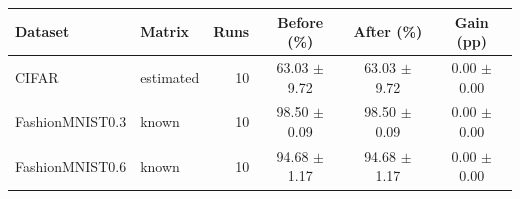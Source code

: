 \begin{tabular}{llrccc}
Dataset & Matrix & Runs & Before (\%) & After (\%) & Gain (pp) \\
\hline
CIFAR & estimated & 10 & 63.03 $\pm$ 9.72 & 63.03 $\pm$ 9.72 & 0.00 $\pm$ 0.00\\
FashionMNIST0.3 & known & 10 & 98.50 $\pm$ 0.09 & 98.50 $\pm$ 0.09 & 0.00 $\pm$ 0.00\\
FashionMNIST0.6 & known & 10 & 94.68 $\pm$ 1.17 & 94.68 $\pm$ 1.17 & 0.00 $\pm$ 0.00\\
\end{tabular}
